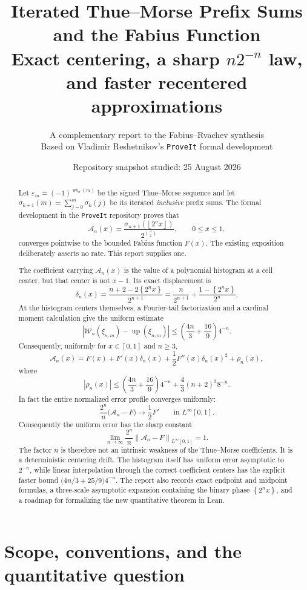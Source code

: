 \documentclass[11pt,oneside]{article}
\title{\bfseries Iterated Thue--Morse Prefix Sums and the Fabius Function\\[0.35em]
\large Exact centering, a sharp $n2^{-n}$ law, and faster recentered approximations}
\author{A complementary report to the Fabius--Rvachev synthesis\\
\small Based on Vladimir Reshetnikov's \texttt{ProveIt} formal development}
\date{Repository snapshot studied: 25 August 2026}
\theoremstyle{definition}
\theoremstyle{remark}
\newcommand{\Up}{\operatorname{up}}
\newcommand{\wt}{\operatorname{wt}_2}
\newcommand{\norm}[1]{\left\lVert #1\right\rVert}
\newcommand{\abs}[1]{\left\lvert #1\right\rvert}
\newcommand{\floor}[1]{\left\lfloor #1\right\rfloor}
\newcommand{\fracpart}[1]{\left\{#1\right\}}
\begin{document}
\maketitle

\begin{abstract}
Let $\varepsilon_m=(-1)^{\wt(m)}$ be the signed Thue--Morse sequence and let
$\sigma_{k+1}(m)=\sum_{j=0}^{m}\sigma_k(j)$ be its iterated \emph{inclusive}
prefix sums.  The formal development in the \texttt{ProveIt} repository proves
that
\[
 \mathcal A_n(x)=
 \frac{\sigma_{n+1}(\floor{2^n x})}{2^{\binom n2}},
 \qquad 0\le x\le1,
\]
converges pointwise to the bounded Fabius function $F(x)$.  The existing
exposition deliberately asserts no rate.  This report supplies one.

The coefficient carrying $\mathcal A_n(x)$ is the value of a polynomial
histogram at a cell center, but that center is not $x-1$.  Its exact displacement is
\[
 \delta_n(x)=\frac{n+2-2\fracpart{2^n x}}{2^{n+1}}
 =\frac{n}{2^{n+1}}+\frac{1-\fracpart{2^n x}}{2^n}.
\]
At the histogram centers themselves, a Fourier-tail factorization and a cardinal
moment calculation give the uniform estimate
\[
 \abs{\mathcal W_n(\xi_{n,m})-\Up(\xi_{n,m})}
 \le \left(\frac{4n}{3}+\frac{16}{9}\right)4^{-n}.
\]
Consequently, uniformly for $x\in[0,1]$ and $n\ge3$,
\[
 \mathcal A_n(x)=F(x)+F'(x)\delta_n(x)
 +\frac12F''(x)\delta_n(x)^2+\rho_n(x),
\]
where
\[
 \abs{\rho_n(x)}\le
 \left(\frac{4n}{3}+\frac{16}{9}\right)4^{-n}
 +\frac43(n+2)^3 8^{-n}.
\]
In fact the entire normalized error profile converges uniformly:
\[
 \frac{2^n}{n}\bigl(\mathcal A_n-F\bigr)
 \longrightarrow \frac12F'
 \qquad\text{in }L^\infty[0,1].
\]
Consequently the uniform error has the sharp constant
\[
 \boxed{\displaystyle
 \lim_{n\to\infty}\frac{2^n}{n}
 \norm{\mathcal A_n-F}_{L^\infty[0,1]}=1.}
\]
The factor $n$ is therefore not an intrinsic weakness of the Thue--Morse
coefficients.  It is a deterministic centering drift.  The histogram itself has
uniform error asymptotic to $2^{-n}$, while linear interpolation through the
correct coefficient centers has the explicit faster bound $\bigl(4n/3+25/9\bigr)4^{-n}$.
The report also records exact endpoint and midpoint formulas, a three-scale
asymptotic expansion containing the binary phase $\fracpart{2^n x}$, and a roadmap
for formalizing the new quantitative theorem in Lean.
\end{abstract}

\tableofcontents
\newpage

\section{Scope, conventions, and the quantitative question}
\label{sec:scope}
\end{document}
